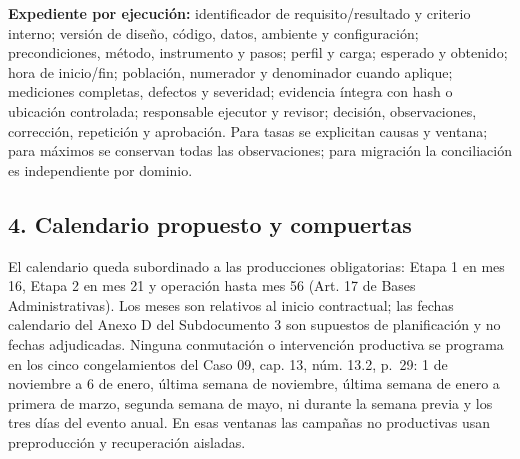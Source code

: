 \documentclass[11pt]{article}
\begin{document}
\textbf{Expediente por ejecución:} identificador de requisito/resultado y criterio interno; versión de diseño, código, datos, ambiente y configuración; precondiciones, método, instrumento y pasos; perfil y carga; esperado y obtenido; hora de inicio/fin; población, numerador y denominador cuando aplique; mediciones completas, defectos y severidad; evidencia íntegra con hash o ubicación controlada; responsable ejecutor y revisor; decisión, observaciones, corrección, repetición y aprobación. Para tasas se explicitan causas y ventana; para máximos se conservan todas las observaciones; para migración la conciliación es independiente por dominio.

\subsection{4. Calendario propuesto y compuertas}\label{t13-calendario-propuesto-y-compuertas}

El calendario queda subordinado a las producciones obligatorias: Etapa 1 en mes 16, Etapa 2 en mes 21 y operación hasta mes 56 (Art. 17 de Bases Administrativas). Los meses son relativos al inicio contractual; las fechas calendario del Anexo D del Subdocumento 3 son supuestos de planificación y no fechas adjudicadas. Ninguna conmutación o intervención productiva se programa en los cinco congelamientos del Caso 09, cap. 13, núm. 13.2, p.~29: 1 de noviembre a 6 de enero, última semana de noviembre, última semana de enero a primera de marzo, segunda semana de mayo, ni durante la semana previa y los tres días del evento anual. En esas ventanas las campañas no productivas usan preproducción y recuperación aisladas.
\end{document}
